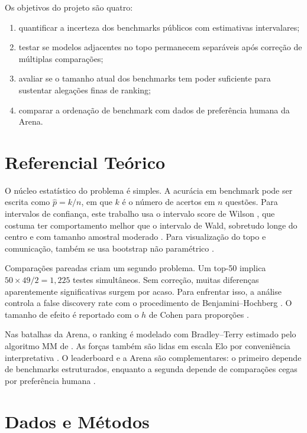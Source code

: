 \documentclass[11pt,a4paper]{article}
\begin{document}
Os objetivos do projeto são quatro:
\begin{enumerate}
    \item quantificar a incerteza dos benchmarks públicos com estimativas intervalares;
    \item testar se modelos adjacentes no topo permanecem separáveis após correção de múltiplas comparações;
    \item avaliar se o tamanho atual dos benchmarks tem poder suficiente para sustentar alegações finas de ranking;
    \item comparar a ordenação de benchmark com dados de preferência humana da Arena.
\end{enumerate}

\section{Referencial Teórico}
O núcleo estatístico do problema é simples. A acurácia em benchmark pode ser escrita como \(\hat{p}=k/n\), em que \(k\) é o número de acertos em \(n\) questões. Para intervalos de confiança, este trabalho usa o intervalo score de Wilson \citep{wilson1927}, que costuma ter comportamento melhor que o intervalo de Wald, sobretudo longe do centro e com tamanho amostral moderado \citep{agresti1998}. Para visualização do topo e comunicação, também se usa bootstrap não paramétrico \citep{efron1979}.

Comparações pareadas criam um segundo problema. Um top-50 implica \(50\times49/2 = 1{,}225\) testes simultâneos. Sem correção, muitas diferenças aparentemente significativas surgem por acaso. Para enfrentar isso, a análise controla a false discovery rate com o procedimento de Benjamini--Hochberg \citep{benjamini1995}. O tamanho de efeito é reportado com o \(h\) de Cohen para proporções \citep{cohen1988}.

Nas batalhas da Arena, o ranking é modelado com Bradley--Terry \citep{bradley1952} estimado pelo algoritmo MM de \citet{ford1957}. As forças também são lidas em escala Elo por conveniência interpretativa \citep{elo1978}. O leaderboard e a Arena são complementares: o primeiro depende de benchmarks estruturados, enquanto a segunda depende de comparações cegas por preferência humana \citep{zheng2023arena,arena2026}.

\section{Dados e Métodos}
\end{document}
